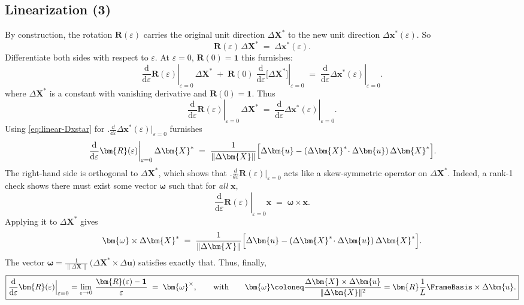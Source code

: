 \subsection{Linearization (3)}

By construction, the rotation \(\bm{R}(\varepsilon)\) carries the
original unit direction \(\Delta \bm{X}^*\) to the new unit direction
\(\Delta \bm{x}^*(\varepsilon)\). So \[
  \bm{R}(\varepsilon)\,\Delta \bm{X}^*
  \;=\;
  \Delta \bm{x}^*(\varepsilon).
\] 
Differentiate both sides with respect to \(\varepsilon\). At
\(\varepsilon=0\), \(\bm{R}(0)=\mathbf{1}\) this furnishes:
\[
  \left.\frac{\mathrm{d}}{\mathrm{d}\varepsilon}\bm{R}(\varepsilon)\right|_{\varepsilon=0}\,\Delta \bm{X}^*
  \;+\;
  \bm{R}(0)\;
  \left.\frac{\mathrm{d}}{\mathrm{d}\varepsilon}\bigl[\Delta \bm{X}^*\bigr]\right|_{\varepsilon=0}
  \;=\;
  \left.\frac{\mathrm{d}}{\mathrm{d}\varepsilon}\Delta \bm{x}^*(\varepsilon)\right|_{\varepsilon=0}.
\]
where \(\Delta \bm{X}^*\) is a constant with vanishing derivative  
and \(\bm{R}(0)=\mathbf{1}\). 
Thus 
\[
  \left.\frac{\mathrm{d}}{\mathrm{d}\varepsilon}\bm{R}(\varepsilon)\right|_{\varepsilon=0}\,\Delta \bm{X}^*
  \;=\;
  \left.\frac{\mathrm{d}}{\mathrm{d}\varepsilon}\Delta \bm{x}^*(\varepsilon)\right|_{\varepsilon=0}.
\] 
Using \eqref{eq:linear-Dxstar} for 
\(\displaystyle \bigl.\tfrac{\dd}{\dd\varepsilon}\Delta \bm{x}^*(\varepsilon)\bigr|_{\varepsilon=0}\) furnishes
%
\[
  \left.\frac{\mathrm{d}}{\mathrm{d}\varepsilon}\bm{R}(\varepsilon)\right|_{\varepsilon=0}\Delta \bm{X}^*
  \;=\;
  \frac{1}{\|\Delta \bm{X}\|}
  \Bigl[
    \Delta \bm{u}
    - (\Delta \bm{X}^*\!\cdot \Delta \bm{u})\,\Delta \bm{X}^*
  \Bigr].
\] 
The right-hand side is orthogonal to
\(\Delta \bm{X}^*\), which shows that
\(\bigl.\tfrac{d}{d\varepsilon}\bm{R}(\varepsilon)\bigr|_{\varepsilon=0}\)
acts like a skew-symmetric operator on \(\Delta \bm{X}^*\). 
%
Indeed, a rank-1 check shows there must exist some vector
\(\bm{\omega}\) such that for \emph{all} \(\mathbf{x}\), \[
  \left.\frac{\mathrm{d}}{\mathrm{d}\varepsilon}\bm{R}(\varepsilon)\right|_{\varepsilon=0}\mathbf{x}
  \;=\;
  \bm{\omega}\times \mathbf{x}.
\] 
Applying it to \(\Delta \bm{X}^*\) gives 
\[
  \bm{\omega}\times \Delta \bm{X}^*
  \;=\;
  \frac{1}{\|\Delta \bm{X}\|}
  \Bigl[
    \Delta \bm{u}
    - (\Delta \bm{X}^*\!\cdot \Delta \bm{u})\,\Delta \bm{X}^*
  \Bigr].
\] 
The vector 
\(\bm{\omega} = \tfrac{1}{\|\Delta \bm{X}\|}\,\bigl(\Delta \bm{X}^*\times \Delta \bm{u}\bigr)\)
satisfies exactly that. 
Thus, finally, 
\begin{equation}
  \boxed{
  \frac{\mathrm{d}}{\mathrm{d}\varepsilon}\bm{R}(\varepsilon)\Big|_{\varepsilon=0}
  = \lim_{\varepsilon\to 0}\,
  \frac{\bm{R}(\varepsilon) - \mathbf{1}}{\varepsilon}
  \;=\;
  \bm{\omega}^{\times},
  \qquad\text{with}\qquad
  \bm{\omega}
  \coloneq
  \frac{\Delta \bm{X}\times \Delta \bm{u}}{\|\Delta \bm{X}\|^2}
  =\bm{R}\frac{1}{L} \FrameBasis \times \Delta \bm{u}.
  }
\end{equation}


